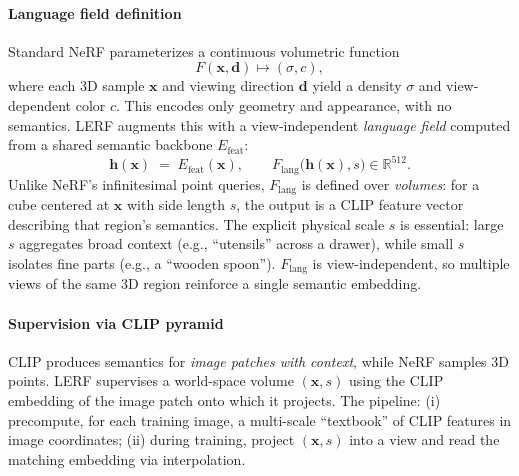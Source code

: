 \begin{enrichment}
\begin{enrichment}
        \paragraph{Language field definition}
        Standard NeRF parameterizes a continuous volumetric function
        \[
        F(\mathbf{x}, \mathbf{d}) \mapsto (\sigma, c),
        \]
        where each 3D sample $\mathbf{x}$ and viewing direction $\mathbf{d}$ yield a density $\sigma$ and view-dependent color $c$. This encodes only geometry and appearance, with no semantics. LERF augments this with a view-independent \emph{language field} computed from a shared semantic backbone $E_{\text{feat}}$:
        \[
        \mathbf{h}(\mathbf{x}) \;=\; E_{\text{feat}}(\mathbf{x}), \qquad
        F_{\text{lang}}\!\big(\mathbf{h}(\mathbf{x}), s\big) \in \mathbb{R}^{512}.
        \]
        Unlike NeRF’s infinitesimal point queries, $F_{\text{lang}}$ is defined over \emph{volumes}: for a cube centered at $\mathbf{x}$ with side length $s$, the output is a CLIP feature vector describing that region’s semantics. The explicit physical scale $s$ is essential: large $s$ aggregates broad context (e.g., ``utensils'' across a drawer), while small $s$ isolates fine parts (e.g., a ``wooden spoon''). $F_{\text{lang}}$ is view-independent, so multiple views of the same 3D region reinforce a single semantic embedding.
        
        \paragraph{Supervision via CLIP pyramid}
        CLIP produces semantics for \emph{image patches with context}, while NeRF samples 3D points. LERF supervises a world-space volume $(\mathbf{x}, s)$ using the CLIP embedding of the image patch onto which it projects. The pipeline: (i) precompute, for each training image, a multi-scale “textbook” of CLIP features in image coordinates; (ii) during training, project $(\mathbf{x}, s)$ into a view and read the matching embedding via interpolation.
        

\end{enrichment}
\end{enrichment}
